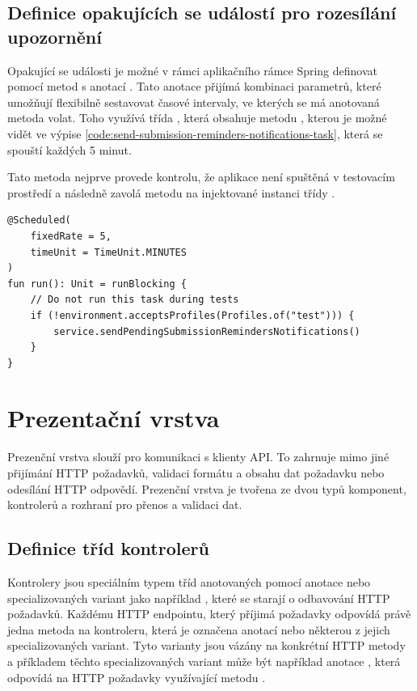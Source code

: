 \subsection{Definice opakujících se událostí pro rozesílání upozornění}

Opakující se události je možné v rámci aplikačního rámce Spring definovat pomocí metod s anotací . Tato anotace přijímá kombinaci parametrů, které umožňují flexibilně sestavovat časové intervaly, ve kterých se má anotovaná metoda volat. Toho využívá třída , která obsahuje metodu , kterou je možné vidět ve výpise \ref{code:send-submission-reminders-notifications-task}, která se spouští každých 5 minut. 

Tato metoda nejprve provede kontrolu, že aplikace není spuštěná v testovacím prostředí a následně zavolá metodu  na injektované instanci třídy .

\begin{lstlisting}[label={code:send-submission-reminders-notifications-task}, caption={Definice periodicky spouštěné metody run}]
@Scheduled(
    fixedRate = 5,
    timeUnit = TimeUnit.MINUTES
)
fun run(): Unit = runBlocking {
    // Do not run this task during tests
    if (!environment.acceptsProfiles(Profiles.of("test"))) {
        service.sendPendingSubmissionRemindersNotifications()
    }
}
\end{lstlisting}

\section{Prezentační vrstva}

Prezenční vrstva slouží pro komunikaci s klienty API. To zahrnuje mimo jiné přijímání HTTP požadavků, validaci formátu a obsahu dat požadavku nebo odesílání HTTP odpovědí. Prezenční vrstva je tvořena ze dvou typů komponent, kontrolerů a rozhraní pro přenos a validaci dat.

\subsection{Definice tříd kontrolerů}


Kontrolery jsou speciálním typem tříd anotovaných pomocí anotace  nebo specializovaných variant jako například , které se starají o odbavování HTTP požadavků. Každému HTTP endpointu, který příjimá požadavky odpovídá právě jedna metoda na kontroleru, která je označena anotací  nebo některou z jejich specializovaných variant. Tyto varianty jsou vázány na konkrétní HTTP metody a příkladem těchto specializovaných variant může být například anotace , která odpovídá na HTTP požadavky využívající metodu  \cite[kap. 1.3.1]{walls_spring_2019}.

